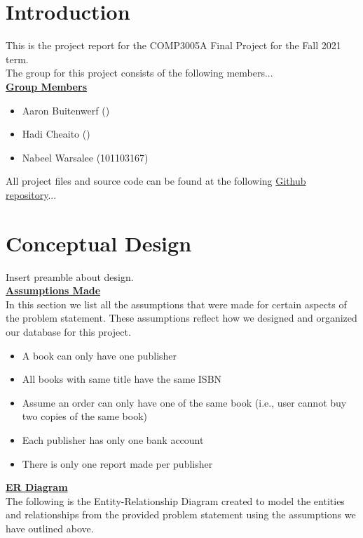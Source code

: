 \documentclass[a4 paper]{article}
\begin{document}

\section*{Introduction}
This is the project report for the COMP3005A Final Project for the Fall 2021 term.\\
The group for this project consists of the following members...\\

\noindent\underline{\textbf{Group Members}}
\begin{itemize}
	\item Aaron Buitenwerf ()
	\item Hadi Cheaito ()
	\item Nabeel Warsalee (101103167)
\end{itemize}

\noindent All project files and source code can be found at the following \href{https://github.com/COMP3005A-Project/bookstore}{Github repository}...

\section{Conceptual Design}
Insert preamble about design.\\

\noindent\underline{\textbf{Assumptions Made}}\\
In this section we list all the assumptions that were made for certain aspects of the problem statement. These assumptions reflect how we designed and organized our database for this project.

\begin{itemize}
	\item A book can only have one publisher
	\item All books with same title have the same ISBN
	\item Assume an order can only have one of the same book (i.e., user cannot buy two copies of the same book)
	\item Each publisher has only one bank account
	\item There is only one report made per publisher
\end{itemize}

\noindent\underline{\textbf{ER Diagram}}\\
The following is the Entity-Relationship Diagram created to model the entities and relationships from the provided problem statement using the assumptions we have outlined above.\\
\end{document}
